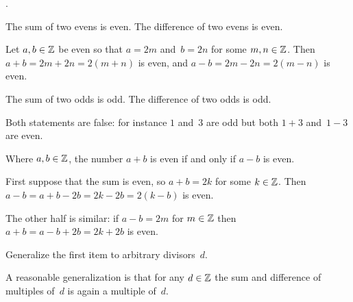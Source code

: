 \documentclass{test}  %
\begin{document}
\begin{problem} 
\pord.
\begin{exes}
\begin{exercise}
  The sum of two evens is even.
  The difference of two evens is even.  
\end{exercise}
\begin{answer}
  Let $a,b\in\mathbb{Z}$ be even so that $a=2m$ and~$b=2n$ for some $m,n\in\mathbb{Z}$.
  Then $a+b=2m+2n=2(m+n)$ is even, and $a-b=2m-2n=2(m-n)$ is even.  
\end{answer}

\begin{exercise}
  The sum of two odds is odd. 
  The difference of two odds is odd.  
\end{exercise}
\begin{answer}
  Both statements are false: for instance $1$ and~$3$ are odd
  but both $1+3$ and~$1-3$ are even.  
\end{answer}

\begin{exercise}
  Where $a,b\in\mathbb{Z}$, the number $a+b$ is even if and only if $a-b$ is even.
\end{exercise}
\begin{answer}
  First suppose that the sum is even, so $a+b=2k$ for some $k\in\mathbb{Z}$.
  Then $a-b=a+b-2b=2k-2b=2(k-b)$ is even.

  The other half is similar:
  if $a-b=2m$ for $m\in\mathbb{Z}$ then $a+b=a-b+2b=2k+2b$ is even.  
\end{answer}

\begin{exercise}
  Generalize the first item to arbitrary divisors~$d$.
\end{exercise}
\begin{answer}
  A reasonable generalization is that for any $d\in\mathbb{Z}$
  the sum and difference of multiples of~$d$ is again a multiple of~$d$.
 

\end{answer}
\end{exes}
\end{problem}
\end{document}
